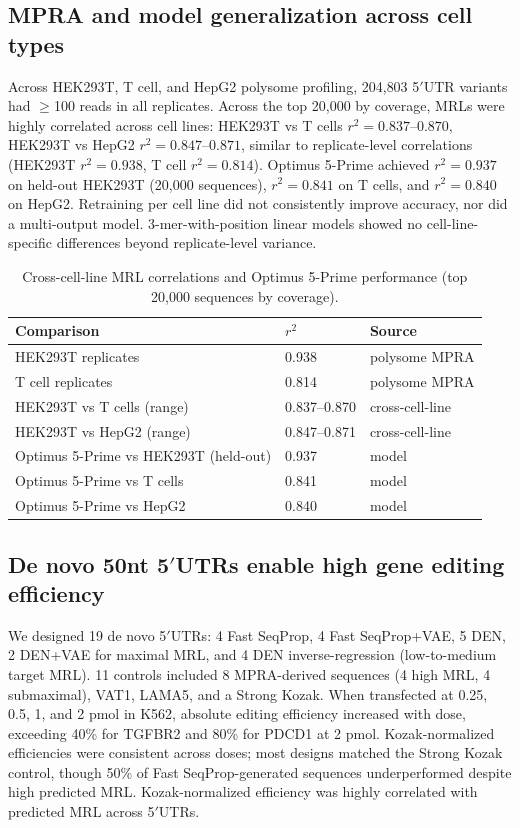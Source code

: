 \documentclass[11pt]{article}
\begin{document}
\subsection{MPRA and model generalization across cell types}
Across HEK293T, T cell, and HepG2 polysome profiling, 204{,}803 5$'$UTR variants had $\geq$100 reads in all replicates. Across the top 20{,}000 by coverage, MRLs were highly correlated across cell lines: HEK293T vs T cells $r^2 = 0.837$--$0.870$, HEK293T vs HepG2 $r^2 = 0.847$--$0.871$, similar to replicate-level correlations (HEK293T $r^2 = 0.938$, T cell $r^2 = 0.814$). Optimus 5-Prime achieved $r^2 = 0.937$ on held-out HEK293T (20{,}000 sequences), $r^2 = 0.841$ on T cells, and $r^2 = 0.840$ on HepG2. Retraining per cell line did not consistently improve accuracy, nor did a multi-output model. 3-mer-with-position linear models showed no cell-line-specific differences beyond replicate-level variance.

\begin{table}[h]
\centering
\caption{Cross-cell-line MRL correlations and Optimus 5-Prime performance (top 20{,}000 sequences by coverage).}
\begin{tabular}{lll}
\toprule
Comparison & $r^2$ & Source \\
\midrule
HEK293T replicates & 0.938 & polysome MPRA \\
T cell replicates & 0.814 & polysome MPRA \\
HEK293T vs T cells (range) & 0.837--0.870 & cross-cell-line \\
HEK293T vs HepG2 (range) & 0.847--0.871 & cross-cell-line \\
Optimus 5-Prime vs HEK293T (held-out) & 0.937 & model \\
Optimus 5-Prime vs T cells & 0.841 & model \\
Optimus 5-Prime vs HepG2 & 0.840 & model \\
\bottomrule
\end{tabular}
\end{table}

\subsection{De novo 50nt 5$'$UTRs enable high gene editing efficiency}
We designed 19 de novo 5$'$UTRs: 4 Fast SeqProp, 4 Fast SeqProp+VAE, 5 DEN, 2 DEN+VAE for maximal MRL, and 4 DEN inverse-regression (low-to-medium target MRL). 11 controls included 8 MPRA-derived sequences (4 high MRL, 4 submaximal), VAT1, LAMA5, and a Strong Kozak. When transfected at 0.25, 0.5, 1, and 2 pmol in K562, absolute editing efficiency increased with dose, exceeding 40\% for TGFBR2 and 80\% for PDCD1 at 2 pmol. Kozak-normalized efficiencies were consistent across doses; most designs matched the Strong Kozak control, though 50\% of Fast SeqProp-generated sequences underperformed despite high predicted MRL. Kozak-normalized efficiency was highly correlated with predicted MRL across 5$'$UTRs.
\end{document}
